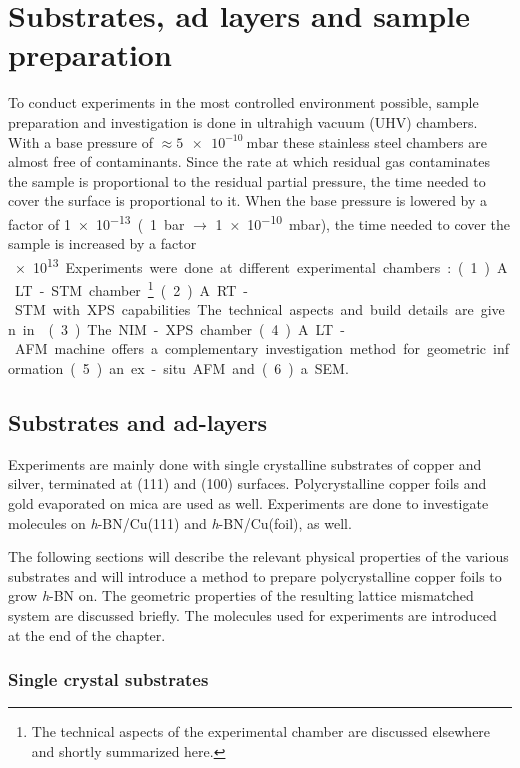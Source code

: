 \documentclass[
twoside,				%
BCOR=8mm,				%
headings=normal,		%
headsepline,			%
footsepline,			%
plainfootsepline,		%
]{scrbook}
\begin{document}
\chapter{Substrates, ad layers and sample preparation}
To conduct experiments in the most controlled environment possible, sample preparation and investigation is done in ultrahigh vacuum (UHV) chambers. With a base pressure of $\approx \SI{5e-10}{\milli \bar}$ these stainless steel chambers are almost free of contaminants. Since the rate at which residual gas contaminates the sample is proportional to the residual partial pressure, the time needed to cover the surface is proportional to it. When the base pressure is lowered by a factor of \SI{1e-13} (\SI{1}{\bar} $\rightarrow$ \SI{1e-10}{\milli \bar}), the time needed to cover the sample is increased by a factor \SI{e13}. 

Experiments were done at different experimental chambers: (1) A LT-STM chamber. \footnote{The technical aspects of the experimental chamber are discussed elsewhere \cite{urgel_tendero_two-dimensional_2015, schwarz_assembly_2018, wiengarten_scanning_2015} and shortly summarized here.} (2) A RT-STM with XPS capabilities. The technical aspects and build details are given in \cite{schwarz_assembly_2018}. (3) The NIM-XPS chamber. 
(4) A LT-AFM machine offers a complementary investigation method for geometric information. (5) an ex-situ AFM and (6) a SEM.


  \section{Substrates and ad-layers}
Experiments are mainly done with single crystalline substrates of copper and silver, terminated at (111) and (100) surfaces. Polycrystalline copper foils and gold evaporated on mica are used as well. Experiments are done to investigate molecules on \textit{h}-BN/Cu(111) and \textit{h}-BN/Cu(foil), as well.

The following sections will describe the relevant physical properties of the various substrates and will introduce a method to prepare polycrystalline copper foils to grow \textit{h}-BN on. The geometric properties of the resulting lattice mismatched system are discussed briefly. The molecules used for experiments are introduced at the end of the chapter.
     \subsection{Single crystal substrates}
        
\end{document}
